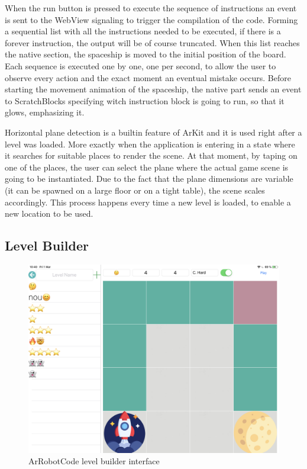\documentclass[12 pct]{report}
\begin{document}
When the run button is pressed to execute the sequence of instructions an event is sent to the WebView signaling to trigger the compilation of the code. 
Forming a sequential list with all the instructions needed to be executed, if there is a forever instruction, the output will be of course truncated. 
When this list reaches the native section, the spaceship is moved to the initial position of the board.
Each sequence is executed one by one, one per second, to allow the user to observe every action and the exact moment an eventual mistake occurs. 
Before starting the movement animation of the spaceship, the native part sends an event to ScratchBlocks specifying witch instruction block is going to run, so that it glows, emphasizing it.

Horizontal plane detection is a builtin feature of ArKit and it is used right after a level was loaded. 
More exactly when the application is entering in a state where it searches for suitable places to render the scene. 
At that moment, by taping on one of the places, the user can select the plane where the actual game scene is going to be instantiated. 
Due to the fact that the plane dimensions are variable (it can be spawned on a large floor or on a tight table), the scene scales accordingly. 
This process happens every time a new level is loaded, to enable a new location to be used.

\subsection*{Level Builder}

\begin{figure}[H]
\includegraphics[width=1.0\textwidth]{ArRobotCode3}
\centering
\caption{ArRobotCode level builder interface}
\label{fig:buildinglvl}
\end{figure}
\end{document}
